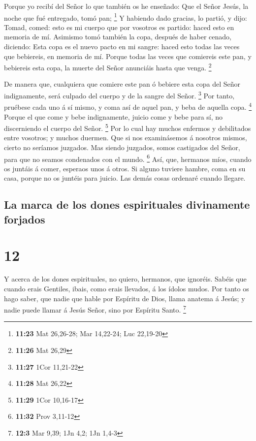  Porque yo recibí del Señor lo que también os he
enseñado: Que el Señor Jesús, la noche que fué entregado, tomó pan;
\footnote{\textbf{11:23} Mat 26,26-28; Mar 14,22-24; Luc 22,19-20}
 Y habiendo dado gracias, lo partió, y dijo: Tomad,
comed: esto es mi cuerpo que por vosotros es partido: haced esto en
memoria de mí.  Asimismo tomó también la copa, después de
haber cenado, diciendo: Esta copa es el nuevo pacto en mi sangre: haced
esto todas las veces que bebiereis, en memoria de mí. 
Porque todas las veces que comiereis este pan, y bebiereis esta copa, la
muerte del Señor anunciáis hasta que venga. \footnote{\textbf{11:26} Mat
  26,29}

 De manera que, cualquiera que comiere este pan ó bebiere
esta copa del Señor indignamente, será culpado del cuerpo y de la sangre
del Señor. \footnote{\textbf{11:27} 1Cor 11,21-22}  Por
tanto, pruébese cada uno á sí mismo, y coma así de aquel pan, y beba de
aquella copa. \footnote{\textbf{11:28} Mat 26,22}  Porque
el que come y bebe indignamente, juicio come y bebe para sí, no
discerniendo el cuerpo del Señor. \footnote{\textbf{11:29} 1Cor 10,16-17}
 Por lo cual hay muchos enfermos y debilitados entre
vosotros; y muchos duermen.  Que si nos examinásemos á
nosotros mismos, cierto no seríamos juzgados.  Mas siendo
juzgados, somos castigados del Señor, para que no seamos condenados con
el mundo. \footnote{\textbf{11:32} Prov 3,11-12}  Así,
que, hermanos míos, cuando os juntáis á comer, esperaos unos á otros.
 Si alguno tuviere hambre, coma en su casa, porque no os
juntéis para juicio. Las demás cosas ordenaré cuando llegare.

\hypertarget{la-marca-de-los-dones-espirituales-divinamente-forjados}{%
\subsection{La marca de los dones espirituales divinamente
forjados}\label{la-marca-de-los-dones-espirituales-divinamente-forjados}}

\hypertarget{section-11}{%
\section{12}\label{section-11}}

 Y acerca de los dones espirituales, no quiero, hermanos,
que ignoréis.  Sabéis que cuando erais Gentiles, ibais,
como erais llevados, á los ídolos mudos.  Por tanto os
hago saber, que nadie que hable por Espíritu de Dios, llama anatema á
Jesús; y nadie puede llamar á Jesús Señor, sino por Espíritu Santo.
\footnote{\textbf{12:3} Mar 9,39; 1Jn 4,2; 1Jn 1,4-3}

